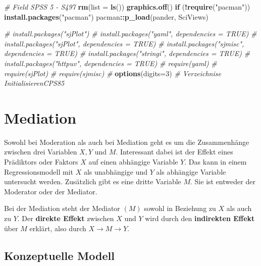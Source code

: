 \documentclass[]{article}
\newenvironment{Shaded}{\begin{snugshade}}{\end{snugshade}}
\newcommand{\CommentTok}[1]{\textcolor[rgb]{0.56,0.35,0.01}{\textit{#1}}}
\newcommand{\ControlFlowTok}[1]{\textcolor[rgb]{0.13,0.29,0.53}{\textbf{#1}}}
\newcommand{\DataTypeTok}[1]{\textcolor[rgb]{0.13,0.29,0.53}{#1}}
\newcommand{\DecValTok}[1]{\textcolor[rgb]{0.00,0.00,0.81}{#1}}
\newcommand{\KeywordTok}[1]{\textcolor[rgb]{0.13,0.29,0.53}{\textbf{#1}}}
\newcommand{\NormalTok}[1]{#1}
\newcommand{\OperatorTok}[1]{\textcolor[rgb]{0.81,0.36,0.00}{\textbf{#1}}}
\newcommand{\StringTok}[1]{\textcolor[rgb]{0.31,0.60,0.02}{#1}}
\begin{document}
\begin{Shaded}
\begin{Highlighting}[]
    \CommentTok{# Field SPSS 5 - S497}
    \KeywordTok{rm}\NormalTok{(}\DataTypeTok{list =} \KeywordTok{ls}\NormalTok{())}
    \KeywordTok{graphics.off}\NormalTok{()}
    \ControlFlowTok{if}\NormalTok{ (}\OperatorTok{!}\KeywordTok{require}\NormalTok{(}\StringTok{"pacman"}\NormalTok{)) }\KeywordTok{install.packages}\NormalTok{(}\StringTok{"pacman"}\NormalTok{)}
\NormalTok{    pacman}\OperatorTok{::}\KeywordTok{p_load}\NormalTok{(pander, SciViews)}
    
    \CommentTok{# install.packages("sjPlot")}
    \CommentTok{# install.packages("yaml", dependencies = TRUE)}
    \CommentTok{# install.packages("sjPlot", dependencies = TRUE)}
    \CommentTok{# install.packages("sjmisc", dependencies = TRUE)}
    \CommentTok{# install.packages("stringi", dependencies = TRUE)}
    \CommentTok{# install.packages("httpuv", dependencies = TRUE)    }
    \CommentTok{# require(yaml)}
    \CommentTok{# require(sjPlot)}
    \CommentTok{# require(sjmisc)}
    \CommentTok{# }
    \KeywordTok{options}\NormalTok{(}\DataTypeTok{digits=}\DecValTok{3}\NormalTok{)}
    \CommentTok{# Verzeichnise InitialisierenCPS85}
\end{Highlighting}
\end{Shaded}

\hypertarget{mediation}{%
\section*{Mediation}\label{mediation}}

Sowohl bei Moderation als auch bei Mediation geht es um die Zusammenhänge zwischen drei Variablen \(X, Y\) und \(M\). Interessant dabei ist der Effekt eines Prädiktors oder Faktors \(X\) auf einen abhängige Variable \(Y\). Das kann in einem Regressionsmodell mit \(X\) als unabhängige und \(Y\) als abhängige Variable untersucht werden. Zusätzlich gibt es eine dritte Variable \(M\). Sie ist entweder der Moderator oder der Mediator.

Bei der Mediation steht der Mediator \((M)\) sowohl in Beziehung zu \(X\) als auch zu \(Y\). Der \textbf{direkte Effekt} zwischen \(X\) und \(Y\) wird durch den \textbf{indirekten Effekt} über \(M\) erklärt, also durch \(X \rightarrow M \rightarrow Y\).

\hypertarget{konzeptuelle-modell}{%
\subsection*{Konzeptuelle Modell}\label{konzeptuelle-modell}}
\end{document}
